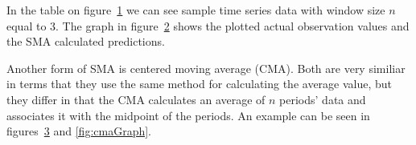 In the table on figure~\ref{fig:smaTable} we can see sample time series data with window size $n$ equal to $3$. The graph in figure~\ref{fig:smaGraph} shows the plotted actual observation values and the SMA calculated predictions.

\begin{figure}[ht]
	\caption{}
	\label{fig:smaTable}
\end{figure}

\begin{figure}[ht]
	\caption{}
	\label{fig:smaGraph}
\end{figure}

Another form of SMA is centered moving average (CMA). Both are very similiar in terms that they use the same method for calculating the average value, but they differ in that the CMA calculates an average of $n$ periods' data and associates it with the midpoint of the periods. An example can be seen in figures~\ref{fig:cmaTable} and \ref{fig:cmaGraph}.

\begin{figure}[ht]
	\caption{}
	\label{fig:cmaTable}
\end{figure}

